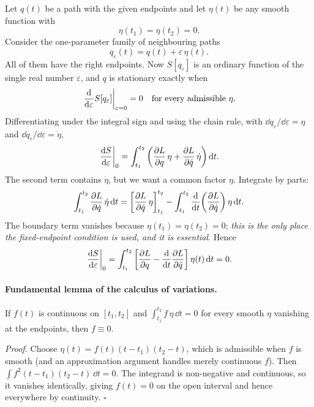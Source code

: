 \documentclass[11pt]{article}
\begin{document}
Let $q(t)$ be a path with the given endpoints and let $\eta(t)$ be any smooth function with
\begin{equation}
  \eta(t_1)=\eta(t_2)=0 .
\end{equation}
Consider the one-parameter family of neighbouring paths
\begin{equation}
  q_\varepsilon(t)=q(t)+\varepsilon\,\eta(t).
\end{equation}
All of them have the right endpoints. Now $S[q_\varepsilon]$ is an ordinary function of the single real number $\varepsilon$, and $q$ is stationary exactly when
\begin{equation}
  \left.\frac{\mathrm{d} }{\mathrm{d} \varepsilon}S[q_\varepsilon]\right|_{\varepsilon=0}=0\quad\text{for every admissible }\eta .
\end{equation}
Differentiating under the integral sign and using the chain rule, with $\dd q_\varepsilon/\dd\varepsilon=\eta$ and $\dd\dot q_\varepsilon/\dd\varepsilon=\dot\eta$,
\begin{equation}
  \left.\frac{\mathrm{d} S}{\mathrm{d} \varepsilon}\right|_0=\int_{t_1}^{t_2}\left(\frac{\partial L}{\partial q}\,\eta+\frac{\partial L}{\partial \dot q}\,\dot\eta\right)\mathrm{d} t .
\end{equation}
The second term contains $\dot\eta$, but we want a common factor $\eta$. Integrate by parts:
\begin{equation}
  \int_{t_1}^{t_2}\frac{\partial L}{\partial \dot q}\,\dot\eta\,\mathrm{d} t=\left[\frac{\partial L}{\partial \dot q}\,\eta\right]_{t_1}^{t_2}-\int_{t_1}^{t_2}\frac{\mathrm{d} }{\mathrm{d} t}\!\left(\frac{\partial L}{\partial \dot q}\right)\eta\,\mathrm{d} t .
\end{equation}
The boundary term vanishes because $\eta(t_1)=\eta(t_2)=0$; \emph{this is the only place the fixed-endpoint condition is used, and it is essential}. Hence
\begin{equation}
  \left.\frac{\mathrm{d} S}{\mathrm{d} \varepsilon}\right|_0=\int_{t_1}^{t_2}\left[\frac{\partial L}{\partial q}-\frac{\mathrm{d} }{\mathrm{d} t}\frac{\partial L}{\partial \dot q}\right]\eta(t)\,\mathrm{d} t=0 .
\end{equation}

\paragraph{Fundamental lemma of the calculus of variations.} If $f(t)$ is continuous on $[t_1,t_2]$ and $\int_{t_1}^{t_2}f\,\eta\,\dd t=0$ for every smooth $\eta$ vanishing at the endpoints, then $f\equiv0$.

\emph{Proof.} Choose $\eta(t)=f(t)(t-t_1)(t_2-t)$, which is admissible when $f$ is smooth (and an approximation argument handles merely continuous $f$). Then $\int f^2(t-t_1)(t_2-t)\,\dd t=0$. The integrand is non-negative and continuous, so it vanishes identically, giving $f(t)=0$ on the open interval and hence everywhere by continuity. $\square$
\end{document}
